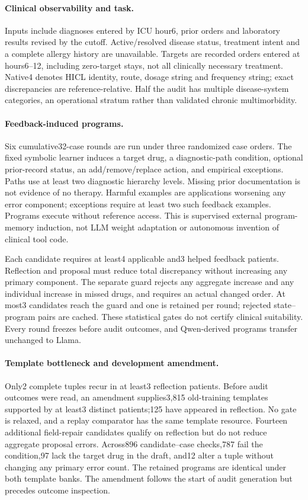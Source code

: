 \paragraph{Clinical observability and task.} Inputs include diagnoses entered by ICU hour6, prior orders and laboratory results revised by the cutoff. Active/resolved disease status, treatment intent and a complete allergy history are unavailable. Targets are recorded orders entered at hours6--12, including zero-target stays, not all clinically necessary treatment. Native4 denotes HICL identity, route, dosage string and frequency string; exact discrepancies are reference-relative. Half the audit has multiple disease-system categories, an operational stratum rather than validated chronic multimorbidity.

\paragraph{Feedback-induced programs.} Six cumulative32-case rounds are run under three randomized case orders. The fixed symbolic learner induces a target drug, a diagnostic-path condition, optional prior-record status, an add/remove/replace action, and empirical exceptions. Paths use at least two diagnostic hierarchy levels. Missing prior documentation is not evidence of no therapy. Harmful examples are applications worsening any error component; exceptions require at least two such feedback examples. Programs execute without reference access. This is supervised external program-memory induction, not LLM weight adaptation or autonomous invention of clinical tool code.

Each candidate requires at least4 applicable and3 helped feedback patients. Reflection and proposal must reduce total discrepancy without increasing any primary component. The separate guard rejects any aggregate increase and any individual increase in missed drugs, and requires an actual changed order. At most3 candidates reach the guard and one is retained per round; rejected state--program pairs are cached. These statistical gates do not certify clinical suitability. Every round freezes before audit outcomes, and Qwen-derived programs transfer unchanged to Llama.

\paragraph{Template bottleneck and development amendment.} Only2 complete tuples recur in at least3 reflection patients. Before audit outcomes were read, an amendment supplies3,815 old-training templates supported by at least3 distinct patients;125 have appeared in reflection. No gate is relaxed, and a replay comparator has the same template resource. Fourteen additional field-repair candidates qualify on reflection but do not reduce aggregate proposal errors. Across896 candidate--case checks,787 fail the condition,97 lack the target drug in the draft, and12 alter a tuple without changing any primary error count. The retained programs are identical under both template banks. The amendment follows the start of audit generation but precedes outcome inspection.

